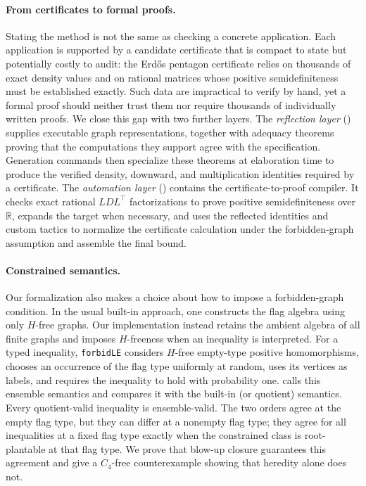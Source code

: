 \documentclass{article}
\newcommand{\lean}[1]{\texttt{#1}}
\begin{document}
\paragraph{From certificates to formal proofs.}
Stating the method is not the same as checking a concrete application.  Each
application is supported by a candidate certificate that is compact to state
but potentially costly to audit: the Erd\H{o}s pentagon certificate relies
on thousands of exact density values and on rational matrices whose
positive semidefiniteness must be established exactly.  Such data are
impractical to verify by hand, yet a formal proof should neither trust them nor
require thousands of individually written proofs.  We close this gap with two
further layers.  The
\emph{reflection layer} () supplies executable graph
representations, together with adequacy theorems proving that the computations
they support agree with the specification.  Generation commands then
specialize these theorems at elaboration time to produce the verified density,
downward, and multiplication identities required by a certificate.  The
\emph{automation layer} () contains the
certificate-to-proof compiler.  It checks exact rational $LDL^\top$
factorizations to prove positive semidefiniteness over $\mathbb{R}$, expands
the target when necessary, and uses the reflected identities and custom
tactics to normalize the certificate calculation under the forbidden-graph
assumption and assemble the final bound.

\paragraph{Constrained semantics.}
Our formalization also makes a choice about how to impose a forbidden-graph
condition.  In the usual built-in approach, one constructs the flag algebra
using only \(H\)-free graphs.  Our implementation instead retains the ambient
algebra of all finite graphs and imposes \(H\)-freeness when an inequality is
interpreted.  For a typed inequality, \lean{forbidLE} considers \(H\)-free
empty-type positive homomorphisms, chooses an occurrence of the flag type
uniformly at random, uses its vertices as labels, and requires the inequality
to hold with probability one.   calls this ensemble
semantics and compares it with the built-in (or quotient) semantics.  Every
quotient-valid inequality is ensemble-valid.  The two orders agree at the
empty flag type, but they can differ at a nonempty flag type; they agree for all
inequalities at a fixed flag type exactly when the constrained class is
root-plantable at that flag type.  We prove that blow-up closure guarantees this
agreement and give a \(C_4\)-free counterexample showing that heredity alone
does not.
\end{document}

